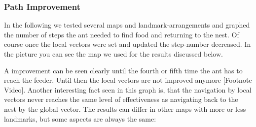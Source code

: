 \documentclass[11pt]{article}
\begin{document}
\subsubsection{Path Improvement}
In the following we tested several maps and landmark-arrangements and graphed the number of steps the ant needed to find food and returning to the nest. Of course once the local vectors were set and updated the step-number decreased. In the picture you can see the map we used for the results discussed below.
\begin{figure}
	\centering
\end{figure}
A improvement can be seen clearly until the fourth or fifth time the ant has to reach the feeder. Until then the local vectors are not improved anymore [Footnote Video]. Another interesting fact seen in this graph is, that the navigation by local vectors never reaches the same level of effectiveness as navigating back to the nest by the global vector. The results can differ in other maps with more or less landmarks, but some aspects are always the same:
\end{document}
